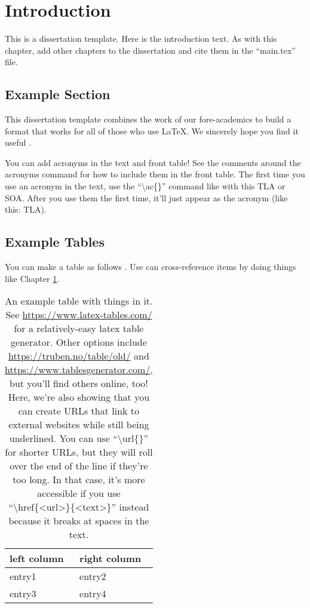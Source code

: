 \chapter{Introduction}
\label{chpt:introduction}

This is a dissertation template. Here is the introduction text. As with this chapter, add other chapters to the dissertation and cite them in the ``main.tex'' file.


\section{Example Section}
\label{sec:examplesec1}

This dissertation template combines the work of our fore-academics to build a format that works for all of those who use \LaTeX \cite{jefferson2019policing}. We sincerely hope you find it useful \cite{shannon1948mathematical}.

You can add acronyms in the text and front table! See the comments around the acronyms command for how to include them in the front table. The first time you use an acronym in the text, use the ``\textbackslash ac\{\}'' command like with this \ac{TLA} or \ac{SOA}. After you use them the first time, it'll just appear as the acronym (like this: \ac{TLA}).

\blindtext


\section{Example Tables}
\label{sec:examplesec2}

You can make a table as follows \cite{ong1997gilbert}. Use can cross-reference items by doing things like Chapter \ref{chpt:introduction}.

\blindtext

\begin{table}[ht]
    \begin{tabular}{l|l}
        \textbf{left column} & \textbf{right column} \\ \hline
        entry1 & entry2 \\
        entry3 & entry4
    \end{tabular}
    \caption{An example table with things in it. See \url{https://www.latex-tables.com/} for a relatively-easy latex table generator. Other options include \url{https://truben.no/table/old/} and \url{https://www.tablesgenerator.com/}, but you'll find others online, too! Here, we're also showing that you can create URLs that link to external websites while still being underlined. You can use ``\textbackslash url\{\}'' for shorter URLs, but they will roll over the end of the line if they're too long. In that case, it's more accessible if you use ``\textbackslash href\{\textless url\textgreater\}\{\textless text\textgreater\}'' instead because it breaks at spaces in the text.}
    \label{tab:my-table}
\end{table}

